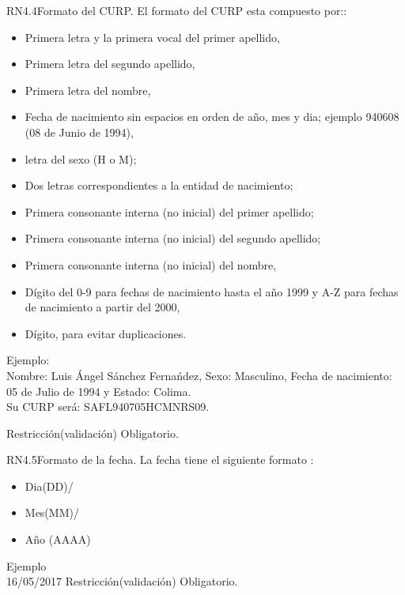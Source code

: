 \begin{BussinesRule}{RN4.4}{Formato del CURP.}
	\BRitem[Descripción:] El formato del CURP esta compuesto por::
		\begin{itemize}
			\item Primera letra y la primera vocal del primer apellido,
			\item Primera letra del segundo apellido,
			\item Primera letra del nombre,
			\item Fecha de nacimiento sin espacios en orden de año, mes y dia; ejemplo 940608 (08 de Junio de 1994),
			\item letra del sexo (H o M);
			\item Dos letras correspondientes a la entidad de nacimiento;
			\item Primera consonante interna (no inicial) del primer apellido;
			\item Primera consonante interna (no inicial) del segundo apellido;
			\item Primera consonante interna (no inicial) del nombre,
			\item Dígito del 0-9 para fechas de nacimiento hasta el año 1999 y A-Z para fechas de nacimiento a partir del 2000,
			\item Dígito, para evitar duplicaciones.			
		\end{itemize}

Ejemplo:\\
	Nombre: Luis Ángel Sánchez Fernańdez, Sexo: Masculino, Fecha de nacimiento: 05 de Julio de 1994 y Estado: Colima.\\
	Su CURP será: SAFL940705HCMNRS09.

	\BRitem[Tipo:] Restricción(validación)
	\BRitem[Nivel:] Obligatorio.
\end{BussinesRule}


\begin{BussinesRule}{RN4.5}{Formato de la fecha.}
	\BRitem[Descripción:] La fecha tiene el siguiente formato :
		\begin{itemize} 
			\item Dia(DD)/ 
			\item Mes(MM)/
			\item Año (AAAA)
		\end{itemize}
Ejemplo \\
	16/05/2017
	\BRitem[Tipo:] Restricción(validación)
	\BRitem[Nivel:] Obligatorio.
\end{BussinesRule}

